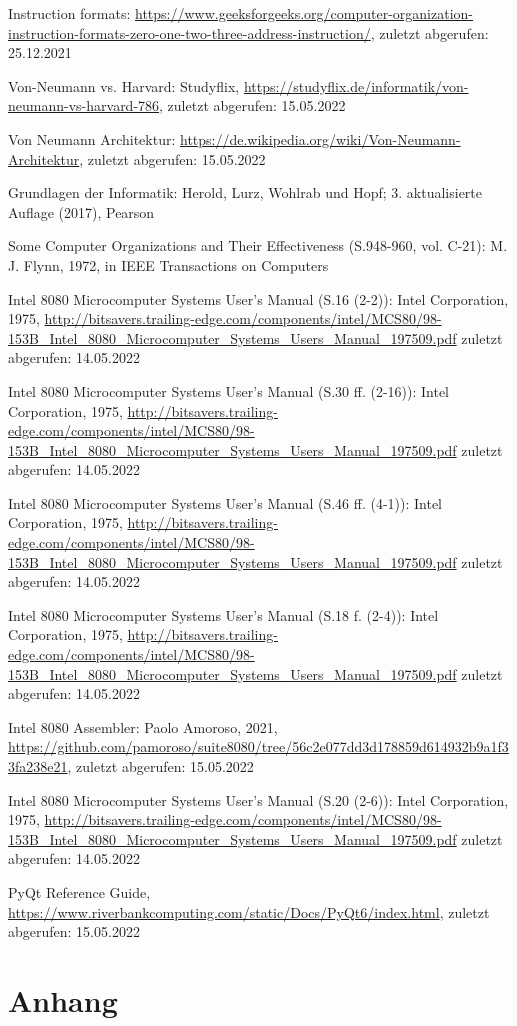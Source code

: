 \documentclass[12pt]{article}
\newcounter{applabelno}
\newcommand{\applabel}[1]{\refstepcounter{applabelno}\label{#1}}
\begin{document}
\newpage


\begin{thebibliography}{9}

Instruction formats: \url{https://www.geeksforgeeks.org/computer-organization-instruction-formats-zero-one-two-three-address-instruction/}, zuletzt abgerufen: 25.12.2021

Von-Neumann vs. Harvard: Studyflix,	\url{https://studyflix.de/informatik/von-neumann-vs-harvard-786}, zuletzt abgerufen: 15.05.2022

Von Neumann Architektur: \url{https://de.wikipedia.org/wiki/Von-Neumann-Architektur}, zuletzt abgerufen: 15.05.2022

Grundlagen der Informatik: Herold, Lurz, Wohlrab und Hopf; 3. aktualisierte Auflage (2017), Pearson

Some Computer Organizations and Their Effectiveness (S.948-960, vol. C-21): M. J. Flynn, 1972, in IEEE Transactions on Computers

Intel 8080 Microcomputer Systems User's Manual (S.16 (2-2)): Intel Corporation, 1975, \url{http://bitsavers.trailing-edge.com/components/intel/MCS80/98-153B_Intel_8080_Microcomputer_Systems_Users_Manual_197509.pdf} zuletzt abgerufen: 14.05.2022

Intel 8080 Microcomputer Systems User's Manual (S.30 ff. (2-16)): Intel Corporation, 1975, \url{http://bitsavers.trailing-edge.com/components/intel/MCS80/98-153B_Intel_8080_Microcomputer_Systems_Users_Manual_197509.pdf} zuletzt abgerufen: 14.05.2022

Intel 8080 Microcomputer Systems User's Manual (S.46 ff. (4-1)): Intel Corporation, 1975, \url{http://bitsavers.trailing-edge.com/components/intel/MCS80/98-153B_Intel_8080_Microcomputer_Systems_Users_Manual_197509.pdf} zuletzt abgerufen: 14.05.2022

Intel 8080 Microcomputer Systems User's Manual (S.18 f. (2-4)): Intel Corporation, 1975, \url{http://bitsavers.trailing-edge.com/components/intel/MCS80/98-153B_Intel_8080_Microcomputer_Systems_Users_Manual_197509.pdf} zuletzt abgerufen: 14.05.2022

Intel 8080 Assembler: Paolo Amoroso, 2021, \url{https://github.com/pamoroso/suite8080/tree/56c2e077dd3d178859d614932b9a1f33fa238e21}, zuletzt abgerufen: 15.05.2022

Intel 8080 Microcomputer Systems User's Manual (S.20 (2-6)): Intel Corporation, 1975, \url{http://bitsavers.trailing-edge.com/components/intel/MCS80/98-153B_Intel_8080_Microcomputer_Systems_Users_Manual_197509.pdf} zuletzt abgerufen: 14.05.2022

PyQt Reference Guide, \url{https://www.riverbankcomputing.com/static/Docs/PyQt6/index.html}, zuletzt abgerufen: 15.05.2022

\end{thebibliography}

\newpage
\thispagestyle{empty}


\appendix
\section*{Anhang}

\applabel{anhang:instr_state}

\end{document}
